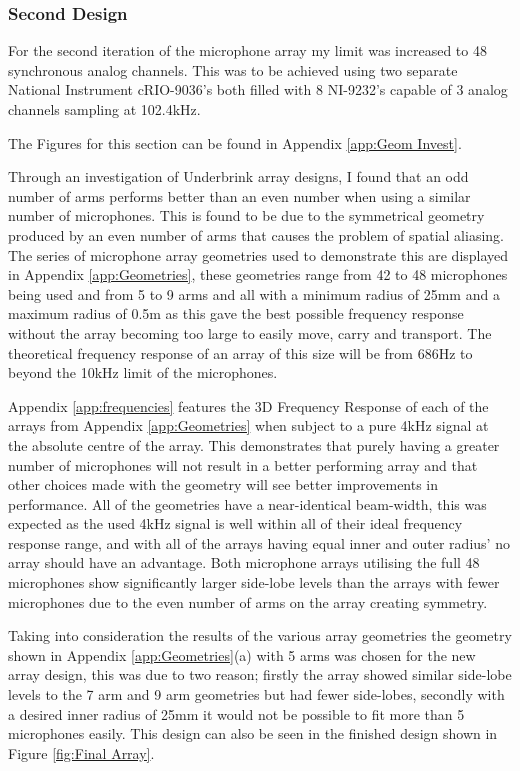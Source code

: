 \documentclass{UoNMCHA}
\numberwithin{equation}{section}
\begin{document}
\subsubsection{Second Design} \label{sec:Second Array Design}
    For the second iteration of the microphone array my limit was increased to 48 synchronous analog channels. This was to be achieved using two separate National Instrument cRIO-9036's both filled with 8 NI-9232's capable of 3 analog channels sampling at 102.4kHz.
    
    The Figures for this section can be found in Appendix \ref{app:Geom Invest}.
    
    Through an investigation of Underbrink array designs, I found that an odd number of arms performs better than an even number when using a similar number of microphones. This is found to be due to the symmetrical geometry produced by an even number of arms that causes the problem of spatial aliasing. The series of microphone array geometries used to demonstrate this are displayed in Appendix \ref{app:Geometries}, these geometries range from 42 to 48 microphones being used and from 5 to 9 arms and all with a minimum radius of 25mm and a maximum radius of 0.5m as this gave the best possible frequency response without the array becoming too large to easily move, carry and transport. The theoretical frequency response of an array of this size will be from 686Hz to beyond the 10kHz limit of the microphones.
    
    Appendix \ref{app:frequencies} features the 3D Frequency Response of each of the arrays from Appendix \ref{app:Geometries} when subject to a pure 4kHz signal at the absolute centre of the array. This demonstrates that purely having a greater number of microphones will not result in a better performing array and that other choices made with the geometry will see better improvements in performance. All of the geometries have a near-identical beam-width, this was expected as the used 4kHz signal is well within all of their ideal frequency response range, and with all of the arrays having equal inner and outer radius' no array should have an advantage. Both microphone arrays utilising the full 48 microphones show significantly larger side-lobe levels than the arrays with fewer microphones due to the even number of arms on the array creating symmetry.
    
    Taking into consideration the results of the various array geometries the geometry shown in Appendix \ref{app:Geometries}(a) with 5 arms was chosen for the new array design, this was due to two reason; firstly the array showed similar side-lobe levels to the 7 arm and 9 arm geometries but had fewer side-lobes, secondly with a desired inner radius of 25mm it would not be possible to fit more than 5 microphones easily. This design can also be seen in the finished design shown in Figure \ref{fig:Final Array}.
        
\end{document}

